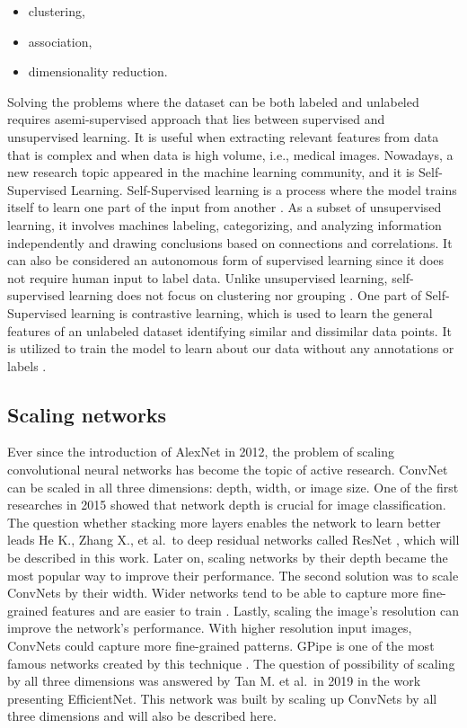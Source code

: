 \documentclass[
]{krantz}
\providecommand{\tightlist}{%
  \setlength{\itemsep}{0pt}\setlength{\parskip}{0pt}}
\begin{document}
\begin{itemize}
\tightlist
\item
  clustering,
\item
  association,
\item
  dimensionality reduction.
\end{itemize}

Solving the problems where the dataset can be both labeled and unlabeled requires asemi-supervised approach that lies between supervised and unsupervised learning. It is useful when extracting relevant features from data that is complex and when data is high volume, i.e., medical images.
Nowadays, a new research topic appeared in the machine learning community, and it is Self-Supervised Learning. Self-Supervised learning is a process where the model trains itself to learn one part of the input from another \citet{selfsup}. As a subset of unsupervised learning, it involves machines labeling, categorizing, and analyzing information independently and drawing conclusions based on connections and correlations. It can also be considered an autonomous form of supervised learning since it does not require human input to label data. Unlike unsupervised learning, self-supervised learning does not focus on clustering nor grouping \citet{selfsup2}. One part of Self-Supervised learning is contrastive learning, which is used to learn the general features of an unlabeled dataset identifying similar and dissimilar data points. It is utilized to train the model to learn about our data without any annotations or labels \citet{contrastive}.

\hypertarget{scaling-networks}{%
\subsection{Scaling networks}\label{scaling-networks}}

Ever since the introduction of AlexNet in 2012, the problem of scaling convolutional neural networks has become the topic of active research. ConvNet can be scaled in all three dimensions: depth, width, or image size. One of the first researches in 2015 showed that network depth is crucial for image classification. The question whether stacking more layers enables the network to learn better leads He K., Zhang X., et al.~to deep residual networks called ResNet \citep{ResNet}, which will be described in this work. Later on, scaling networks by their depth became the most popular way to improve their performance.
The second solution was to scale ConvNets by their width. Wider networks tend to be able to capture more fine-grained features and are easier to train \citet{width}.
Lastly, scaling the image's resolution can improve the network's performance. With higher resolution input images, ConvNets could capture more fine-grained patterns. GPipe is one of the most famous networks created by this technique \citet{gpipe}.
The question of possibility of scaling by all three dimensions was answered by Tan M. et al.~in 2019 in the work presenting EfficientNet. This network was built by scaling up ConvNets by all three dimensions and will also be described here.
\end{document}
